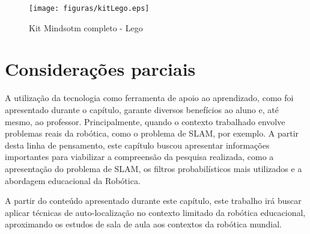 \begin{figure}[H]
	\centering
	\texttt{[image: figuras/kitLego.eps]}
	\caption[Kit Mindsotm completo - Lego]{Kit Mindsotm completo - Lego}
	\label{img:kit}
\end{figure}


\section{Considerações parciais} %
\label{sec:considerações_parciais}

	A utilização da tecnologia como ferramenta de apoio ao aprendizado, como foi apresentado durante o capítulo, garante diversos benefícios ao aluno e, até mesmo, ao professor. Principalmente, quando o contexto trabalhado envolve problemas reais da robótica, como o problema de SLAM, por exemplo. A partir desta linha de pensamento, este capítulo buscou apresentar informações importantes para viabilizar a compreensão da pesquisa realizada, como a apresentação do problema de SLAM, os filtros probabilísticos mais utilizados e a abordagem educacional da Robótica.

	A partir do conteúdo apresentado durante este capítulo, este trabalho irá buscar aplicar técnicas de auto-localização no contexto limitado da robótica educacional, aproximando os estudos de sala de aula aos contextos da robótica mundial.

